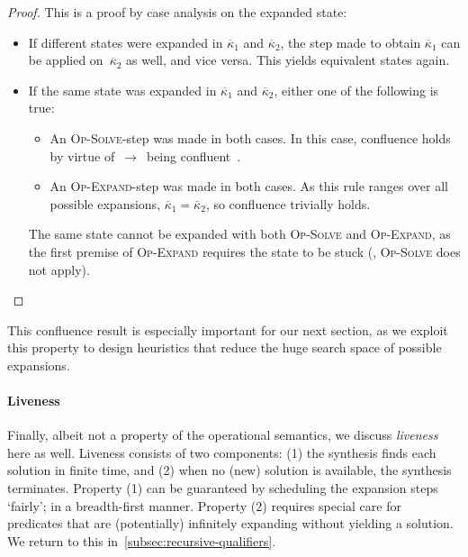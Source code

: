 \begin{proof}
  This is a proof by case analysis on the expanded state:
  \begin{itemize}
    \item If different states were expanded in $\overline{\kappa}_1$ and $\overline{\kappa}_2$, the step made to obtain $\overline{\kappa}_1$ can be applied on~$\overline{\kappa}_2$ as well, and vice versa.
            This yields equivalent states again.
    \item If the same state was expanded in $\overline{\kappa}_1$ and $\overline{\kappa}_2$, either one of the following is true:
    \begin{itemize}
      \item An \textsc{Op-Solve}-step was made in both cases.
        In this case, confluence holds by virtue of~$\rightarrow$~being confluent~\citep[Theorem~4.5]{RouvoetAPKV20}.
      \item An \textsc{Op-Expand}-step was made in both cases.
        As this rule ranges over all possible expansions, $\overline{\kappa}_1 = \overline{\kappa}_2$, so confluence trivially holds.
    \end{itemize}
    The same state cannot be expanded with both \textsc{Op-Solve} and \textsc{Op-Expand}, as the first premise of \textsc{Op-Expand} requires the state to be stuck (\ie, \textsc{Op-Solve} does not apply).
  \end{itemize}
  \vspace{-1.2\baselineskip}
\end{proof}
\noindent
This confluence result is especially important for our next section, as we exploit this property to design heuristics that reduce the huge search space of possible expansions.




\paragraph{Liveness}
Finally, albeit not a property of the operational semantics, we discuss \emph{liveness} here as well.
Liveness consists of two components:
(1) the synthesis finds each solution in finite time, and
(2) when no (new) solution is available, the synthesis terminates.
Property (1) can be guaranteed by scheduling the expansion steps `fairly'; \ie in a breadth-first manner.
Property (2) requires special care for predicates that are (potentially) infinitely expanding without yielding a solution.
We return to this in~\cref{subsec:recursive-qualifiers}.
